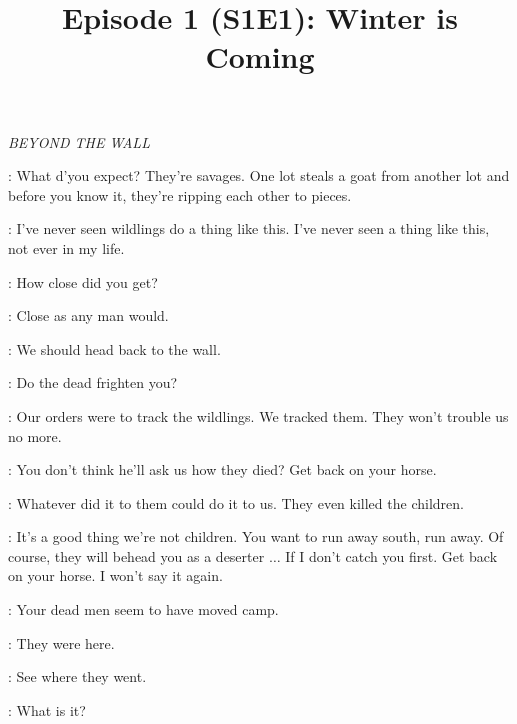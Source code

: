 

\title{Episode 1 (S1E1): Winter is Coming}
\author{}
\date{}
\maketitle




\scene

\textit{BEYOND THE WALL} 


\ROYCE: What d'you expect? They're savages. One lot steals a goat from another lot and before you know it, they're ripping each other to pieces. 

\WILL: I've never seen wildlings do a thing like this. I've never seen a thing like this, not ever in my life. 

\ROYCE: How close did you get? 

\WILL: Close as any man would. 

\GARED: We should head back to the wall. 

\ROYCE: Do the dead frighten you? 

\GARED: Our orders were to track the wildlings. We tracked them. They won't trouble us no more. 

\ROYCE: You don't think he'll ask us how they died? Get back on your horse. 

\WILL: Whatever did it to them could do it to us. They even killed the children. 

\ROYCE: It's a good thing we're not children. You want to run away south, run away. Of course, they will behead you as a deserter $\ldots$ If I don't catch you first. Get back on your horse. I won't say it again. 


\ROYCE: Your dead men seem to have moved camp. 

\WILL: They were here. 

\GARED: See where they went. 


\ROYCE: What is it? 

